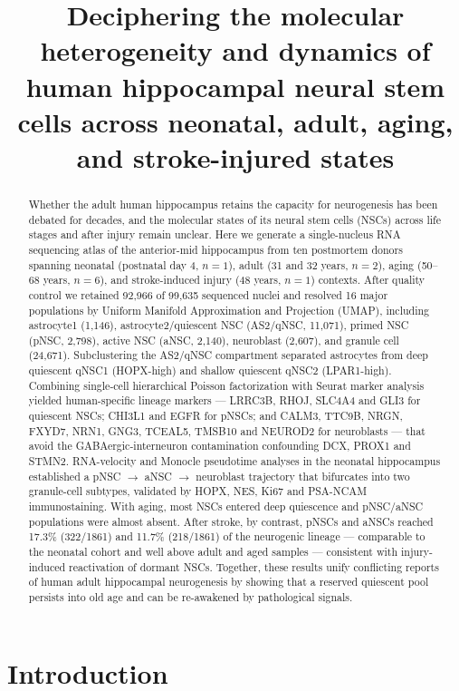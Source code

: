 \documentclass[11pt]{article}
\title{Deciphering the molecular heterogeneity and dynamics of human
hippocampal neural stem cells across neonatal, adult, aging, and
stroke-injured states}
\author[]{}
\affil[]{}
\date{}
\begin{document}
\maketitle

\begin{abstract}
Whether the adult human hippocampus retains the capacity for neurogenesis has
been debated for decades, and the molecular states of its neural stem cells
(NSCs) across life stages and after injury remain unclear. Here we generate a
single-nucleus RNA sequencing atlas of the anterior-mid hippocampus from
ten postmortem donors spanning neonatal (postnatal day 4, $n=1$), adult
(31 and 32 years, $n=2$), aging (50--68 years, $n=6$), and stroke-induced
injury (48 years, $n=1$) contexts. After quality control we retained 92{,}966
of 99{,}635 sequenced nuclei and resolved 16 major populations by Uniform
Manifold Approximation and Projection (UMAP), including astrocyte1 (1{,}146),
astrocyte2/quiescent NSC (AS2/qNSC, 11{,}071), primed NSC (pNSC, 2{,}798),
active NSC (aNSC, 2{,}140), neuroblast (2{,}607), and granule cell (24{,}671).
Subclustering the AS2/qNSC compartment separated astrocytes from deep
quiescent qNSC1 (HOPX-high) and shallow quiescent qNSC2 (LPAR1-high).
Combining single-cell hierarchical Poisson factorization with Seurat marker
analysis yielded human-specific lineage markers --- LRRC3B, RHOJ, SLC4A4 and
GLI3 for quiescent NSCs; CHI3L1 and EGFR for pNSCs; and CALM3, TTC9B, NRGN,
FXYD7, NRN1, GNG3, TCEAL5, TMSB10 and NEUROD2 for neuroblasts --- that avoid
the GABAergic-interneuron contamination confounding DCX, PROX1 and STMN2.
RNA-velocity and Monocle pseudotime analyses in the neonatal hippocampus
established a pNSC $\rightarrow$ aNSC $\rightarrow$ neuroblast trajectory that
bifurcates into two granule-cell subtypes, validated by HOPX, NES, Ki67 and
PSA-NCAM immunostaining. With aging, most NSCs entered deep quiescence and
pNSC/aNSC populations were almost absent. After stroke, by contrast, pNSCs and
aNSCs reached 17.3\% (322/1861) and 11.7\% (218/1861) of the neurogenic lineage
--- comparable to the neonatal cohort and well above adult and aged samples ---
consistent with injury-induced reactivation of dormant NSCs. Together, these
results unify conflicting reports of human adult hippocampal neurogenesis by
showing that a reserved quiescent pool persists into old age and can be
re-awakened by pathological signals.
\end{abstract}

\section{Introduction}
\end{document}
